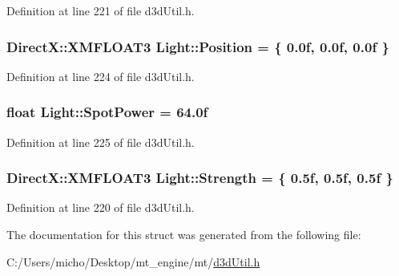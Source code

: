 Definition at line 221 of file d3d\+Util.\+h.

\subsubsection[{\texorpdfstring{Position}{Position}}]{\setlength{\rightskip}{0pt plus 5cm}Direct\+X\+::\+X\+M\+F\+L\+O\+A\+T3 Light\+::\+Position = \{ 0.\+0f, 0.\+0f, 0.\+0f \}}\hypertarget{struct_light_a759c2228a71bfc669460ae4210a48e52_a759c2228a71bfc669460ae4210a48e52}{}\label{struct_light_a759c2228a71bfc669460ae4210a48e52_a759c2228a71bfc669460ae4210a48e52}


Definition at line 224 of file d3d\+Util.\+h.

\subsubsection[{\texorpdfstring{Spot\+Power}{SpotPower}}]{\setlength{\rightskip}{0pt plus 5cm}float Light\+::\+Spot\+Power = 64.\+0f}\hypertarget{struct_light_a7202d90f1b073d3ac170c18451f0bc92_a7202d90f1b073d3ac170c18451f0bc92}{}\label{struct_light_a7202d90f1b073d3ac170c18451f0bc92_a7202d90f1b073d3ac170c18451f0bc92}


Definition at line 225 of file d3d\+Util.\+h.

\subsubsection[{\texorpdfstring{Strength}{Strength}}]{\setlength{\rightskip}{0pt plus 5cm}Direct\+X\+::\+X\+M\+F\+L\+O\+A\+T3 Light\+::\+Strength = \{ 0.\+5f, 0.\+5f, 0.\+5f \}}\hypertarget{struct_light_a015096e9847bd33050b73a13c200a4c1_a015096e9847bd33050b73a13c200a4c1}{}\label{struct_light_a015096e9847bd33050b73a13c200a4c1_a015096e9847bd33050b73a13c200a4c1}


Definition at line 220 of file d3d\+Util.\+h.



The documentation for this struct was generated from the following file\+:\begin{DoxyCompactItemize}
\item 
C\+:/\+Users/micho/\+Desktop/mt\+\_\+engine/mt/\hyperlink{d3d_util_8h}{d3d\+Util.\+h}\end{DoxyCompactItemize}
